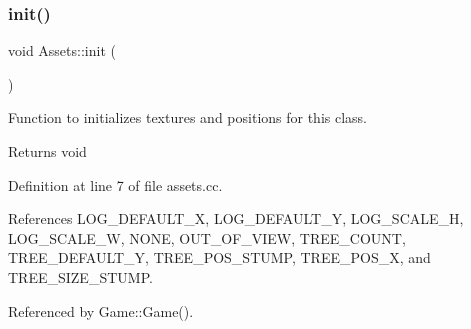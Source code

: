 \subsubsection{\texorpdfstring{init()}{init()}}
{\footnotesize\ttfamily void Assets\+::init (\begin{DoxyParamCaption}{ }\end{DoxyParamCaption})}



Function to initializes textures and positions for this class. 

\begin{DoxyReturn}{Returns}
void 
\end{DoxyReturn}


Definition at line 7 of file assets.\+cc.



References L\+O\+G\+\_\+\+D\+E\+F\+A\+U\+L\+T\+\_\+X, L\+O\+G\+\_\+\+D\+E\+F\+A\+U\+L\+T\+\_\+Y, L\+O\+G\+\_\+\+S\+C\+A\+L\+E\+\_\+H, L\+O\+G\+\_\+\+S\+C\+A\+L\+E\+\_\+W, N\+O\+NE, O\+U\+T\+\_\+\+O\+F\+\_\+\+V\+I\+EW, T\+R\+E\+E\+\_\+\+C\+O\+U\+NT, T\+R\+E\+E\+\_\+\+D\+E\+F\+A\+U\+L\+T\+\_\+Y, T\+R\+E\+E\+\_\+\+P\+O\+S\+\_\+\+S\+T\+U\+MP, T\+R\+E\+E\+\_\+\+P\+O\+S\+\_\+X, and T\+R\+E\+E\+\_\+\+S\+I\+Z\+E\+\_\+\+S\+T\+U\+MP.



Referenced by Game\+::\+Game().


